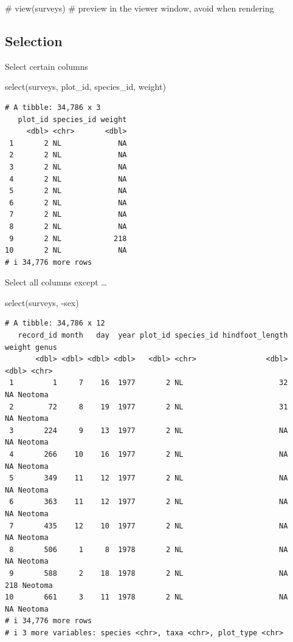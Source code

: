 \documentclass[
  letterpaper,
  DIV=11,
  numbers=noendperiod]{scrreprt}
\newenvironment{Shaded}{\begin{snugshade}}{\end{snugshade}}
\newcommand{\CommentTok}[1]{\textcolor[rgb]{0.37,0.37,0.37}{#1}}
\newcommand{\FunctionTok}[1]{\textcolor[rgb]{0.28,0.35,0.67}{#1}}
\newcommand{\NormalTok}[1]{\textcolor[rgb]{0.00,0.23,0.31}{#1}}
\newcommand{\SpecialCharTok}[1]{\textcolor[rgb]{0.37,0.37,0.37}{#1}}
\begin{document}
\begin{Shaded}
\begin{Highlighting}[]
\CommentTok{\# view(surveys) \# preview in the viewer window, avoid when rendering}
\end{Highlighting}
\end{Shaded}

\subsection{Selection}\label{selection}

Select certain columns

\begin{Shaded}
\begin{Highlighting}[]
\FunctionTok{select}\NormalTok{(surveys, plot\_id, species\_id, weight)}
\end{Highlighting}
\end{Shaded}

\begin{verbatim}
# A tibble: 34,786 x 3
   plot_id species_id weight
     <dbl> <chr>       <dbl>
 1       2 NL             NA
 2       2 NL             NA
 3       2 NL             NA
 4       2 NL             NA
 5       2 NL             NA
 6       2 NL             NA
 7       2 NL             NA
 8       2 NL             NA
 9       2 NL            218
10       2 NL             NA
# i 34,776 more rows
\end{verbatim}

Select all columns except \ldots{}

\begin{Shaded}
\begin{Highlighting}[]
\FunctionTok{select}\NormalTok{(surveys, }\SpecialCharTok{{-}}\NormalTok{sex)}
\end{Highlighting}
\end{Shaded}

\begin{verbatim}
# A tibble: 34,786 x 12
   record_id month   day  year plot_id species_id hindfoot_length weight genus  
       <dbl> <dbl> <dbl> <dbl>   <dbl> <chr>                <dbl>  <dbl> <chr>  
 1         1     7    16  1977       2 NL                      32     NA Neotoma
 2        72     8    19  1977       2 NL                      31     NA Neotoma
 3       224     9    13  1977       2 NL                      NA     NA Neotoma
 4       266    10    16  1977       2 NL                      NA     NA Neotoma
 5       349    11    12  1977       2 NL                      NA     NA Neotoma
 6       363    11    12  1977       2 NL                      NA     NA Neotoma
 7       435    12    10  1977       2 NL                      NA     NA Neotoma
 8       506     1     8  1978       2 NL                      NA     NA Neotoma
 9       588     2    18  1978       2 NL                      NA    218 Neotoma
10       661     3    11  1978       2 NL                      NA     NA Neotoma
# i 34,776 more rows
# i 3 more variables: species <chr>, taxa <chr>, plot_type <chr>
\end{verbatim}
\end{document}

